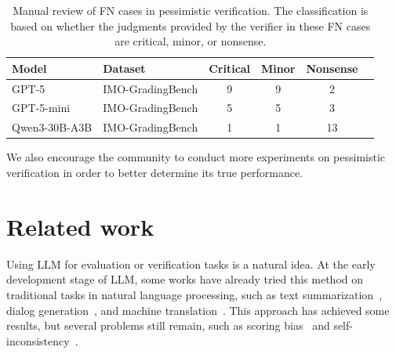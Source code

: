 \documentclass{article} %
\begin{document}
\begin{table}[htbp]
    \centering
    \begin{threeparttable}
    \label{tab:example}
    \begin{tabularx}{1.0\textwidth}{
        l
        l
        S[table-format=2.0]
        S[table-format=2.0]
        S[table-format=2.0]
        S[table-format=2.0]
    }
        \toprule
        {\bf Model} & {\bf Dataset} & {\bf Critical} & {\bf Minor} & {\bf Nonsense} \\
        \midrule
        GPT-5 & IMO-GradingBench & 9 & 9 & 2 \\
        \midrule
        GPT-5-mini & IMO-GradingBench & 5 & 5 & 3 \\
        \midrule
        Qwen3-30B-A3B & IMO-GradingBench & 1 & 1 & 13 \\
        \bottomrule
    \end{tabularx}
      \caption{Manual review of FN cases in pessimistic verification. The classification is based on whether the judgments provided by the verifier in these FN cases are critical, minor, or nonsense.}\label{table:case-studies}
    \end{threeparttable}
\end{table}

We also encourage the community to conduct more experiments on pessimistic verification in order to better determine its true performance.

\section{Related work}

Using LLM for evaluation or verification tasks is a natural idea. At the early development stage of LLM, some works have already tried this method on traditional tasks in natural language processing, such as text summarization~\citep{liu_g-eval_2023}, dialog generation~\citep{liu_g-eval_2023}, and machine translation~\citep{zheng_judging_2023}. This approach has achieved some results, but several problems still remain, such as scoring bias~\citep{li_evaluating_2025} and self-inconsistency~\citep{haldar_rating_2025}.
\end{document}
